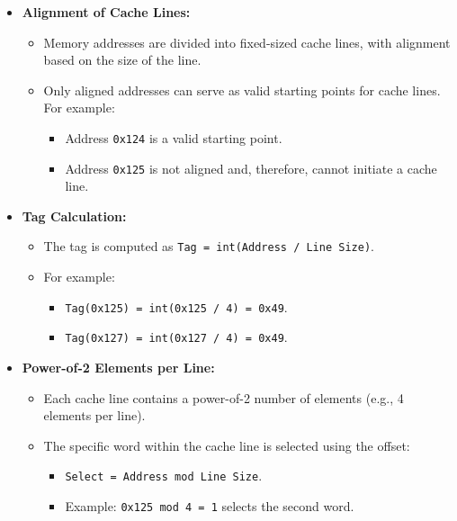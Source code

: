 \begin{itemize}
    \item \textbf{Alignment of Cache Lines:}
    \begin{itemize}
        \item Memory addresses are divided into fixed-sized cache lines, with alignment based on the size of the line.
        \item Only aligned addresses can serve as valid starting points for cache lines. For example:
        \begin{itemize}
            \item Address \texttt{0x124} is a valid starting point.
            \item Address \texttt{0x125} is not aligned and, therefore, cannot initiate a cache line.
        \end{itemize}
    \end{itemize}

    \item \textbf{Tag Calculation:}
    \begin{itemize}
        \item The tag is computed as \texttt{Tag = int(Address / Line Size)}.
        \item For example:
        \begin{itemize}
            \item \texttt{Tag(0x125) = int(0x125 / 4) = 0x49}.
            \item \texttt{Tag(0x127) = int(0x127 / 4) = 0x49}.
        \end{itemize}
    \end{itemize}

    \item \textbf{Power-of-2 Elements per Line:}
    \begin{itemize}
        \item Each cache line contains a power-of-2 number of elements (e.g., 4 elements per line).
        \item The specific word within the cache line is selected using the offset:
        \begin{itemize}
            \item \texttt{Select = Address mod Line Size}.
            \item Example: \texttt{0x125 mod 4 = 1} selects the second word.
        \end{itemize}
    \end{itemize}
\end{itemize}
\newpage
